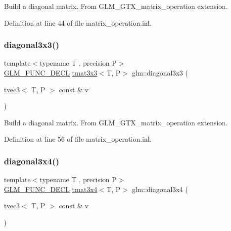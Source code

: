 Build a diagonal matrix. From G\+L\+M\+\_\+\+G\+T\+X\+\_\+matrix\+\_\+operation extension. 

Definition at line 44 of file matrix\+\_\+operation.\+inl.

\mbox{\label{group__gtx__matrix__operation_ga8e817dba22f2305cdebae07bbbe0360c}} 
\subsubsection{\texorpdfstring{diagonal3x3()}{diagonal3x3()}}
{\footnotesize\ttfamily template$<$typename T , precision P$>$ \\
\mbox{\hyperlink{setup_8hpp_ab2d052de21a70539923e9bcbf6e83a51}{G\+L\+M\+\_\+\+F\+U\+N\+C\+\_\+\+D\+E\+CL}} \mbox{\hyperlink{structglm_1_1tmat3x3}{tmat3x3}}$<$T, P$>$ glm\+::diagonal3x3 (\begin{DoxyParamCaption}\item[{\mbox{\hyperlink{structglm_1_1tvec3}{tvec3}}$<$ T, P $>$ const \&}]{v }\end{DoxyParamCaption})}

Build a diagonal matrix. From G\+L\+M\+\_\+\+G\+T\+X\+\_\+matrix\+\_\+operation extension. 

Definition at line 56 of file matrix\+\_\+operation.\+inl.

\mbox{\label{group__gtx__matrix__operation_gae3f85af86c18c80f2acbe3223feb8e81}} 
\subsubsection{\texorpdfstring{diagonal3x4()}{diagonal3x4()}}
{\footnotesize\ttfamily template$<$typename T , precision P$>$ \\
\mbox{\hyperlink{setup_8hpp_ab2d052de21a70539923e9bcbf6e83a51}{G\+L\+M\+\_\+\+F\+U\+N\+C\+\_\+\+D\+E\+CL}} \mbox{\hyperlink{structglm_1_1tmat3x4}{tmat3x4}}$<$T, P$>$ glm\+::diagonal3x4 (\begin{DoxyParamCaption}\item[{\mbox{\hyperlink{structglm_1_1tvec3}{tvec3}}$<$ T, P $>$ const \&}]{v }\end{DoxyParamCaption})}

